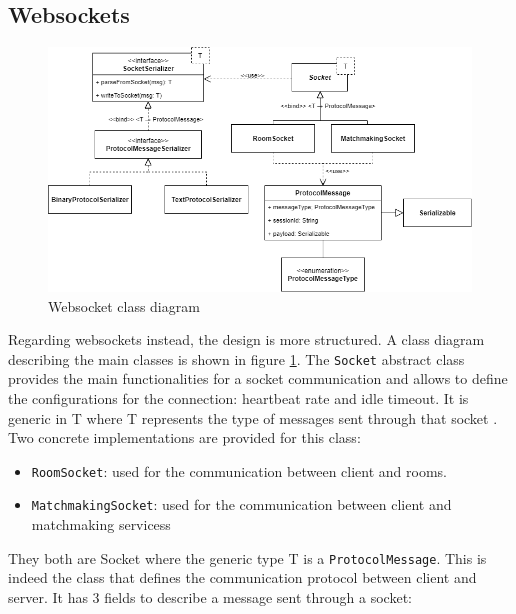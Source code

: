 \subsection{Websockets}
\begin{figure}[h]
	\hspace*{-0.5in}
	\includegraphics[scale=0.6]{images/4-design/communication_protocol.png}
	\caption{Websocket class diagram}
	\label{fig:websocket_communication_design}
\end{figure}
Regarding websockets instead, the design is more structured. A class diagram describing the main classes is shown in figure \ref{fig:websocket_communication_design}.
The \texttt{Socket} abstract class provides the main functionalities for a socket communication and allows to define the configurations for the connection: heartbeat rate and idle timeout. It is generic in T where T represents the type of messages sent through that socket . Two concrete implementations are provided for this class:
\begin{itemize}
	\item \texttt{RoomSocket}: used for the communication between client and rooms.
	\item \texttt{MatchmakingSocket}: used for the communication between client and matchmaking servicess
\end{itemize}
They both are Socket where the generic type T is a \texttt{ProtocolMessage}. This is indeed the class that defines the communication protocol between client and server. It has 3 fields to describe a message sent through a socket:
